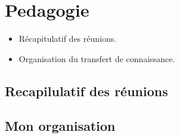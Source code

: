 \section{Pedagogie}

\begin{itemize}
    \item Récapitulatif des réunions.
    \item Organisation du transfert de connaissance.
\end{itemize}

\subsection{Recapilulatif des réunions}

\subsection{Mon organisation}
